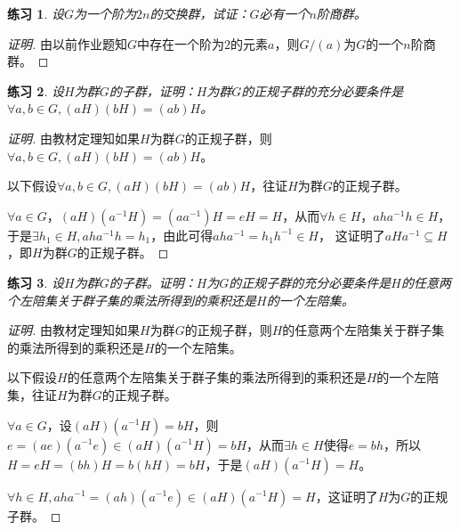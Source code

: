 \documentclass{article}
\newtheorem{Exercise}{练习}
\begin{document}
\begin{CJK*}{UTF8}{gbsn}

\begin{Exercise}
设$G$为一个阶为$2n$的交换群，试证：$G$必有一个$n$阶商群。
\end{Exercise}
\begin{proof}[证明]
  由以前作业题知$G$中存在一个阶为$2$的元素$a$，则$G/(a)$为$G$的一个$n$阶商群。
\end{proof}
\begin{Exercise}
设$H$为群$G$的子群，证明：$H$为群$G$的正规子群的充分必要条件是$\forall a,b\in G,(aH)(bH)=(ab)H$。
\end{Exercise}

\begin{proof}[证明]
  由教材定理知如果$H$为群$G$的正规子群，则$\forall a,b\in G,(aH)(bH)=(ab)H$。

  以下假设$\forall a,b\in G,(aH)(bH)=(ab)H$，往证$H$为群$G$的正规子群。

  $\forall a\in G$，$(aH)(a^{-1}H)=(aa^{-1})H=eH=H$，从而$\forall h\in H$，$aha^{-1}h\in H$，于是$\exists h_1\in H, aha^{-1}h=h_1$，由此可得$aha^{-1}=h_1h^{-1}\in H$，
  这证明了$aHa^{-1}\subseteq H$，即$H$为群$G$的正规子群。
\end{proof}

\begin{Exercise}
  设$H$为群$G$的子群。证明：$H$为$G$的正规子群的充分必要条件是$H$的任意两个左陪集关于群子集的乘法所得到的乘积还是$H$的一个左陪集。
\end{Exercise}
\begin{proof}[证明]
  由教材定理知如果$H$为群$G$的正规子群，则$H$的任意两个左陪集关于群子集的乘法所得到的乘积还是$H$的一个左陪集。

  以下假设$H$的任意两个左陪集关于群子集的乘法所得到的乘积还是$H$的一个左陪集，往证$H$为群$G$的正规子群。

  $\forall a\in G$，设$(aH)(a^{-1}H)=bH$，则$e=(ae)(a^{-1}e)\in (aH)(a^{-1}H)=bH$，从而$\exists h\in H$使得$e=bh$，所以$H=eH=(bh)H=b(hH)=bH$，于是$(aH)(a^{-1}H)=H$。

$\forall h\in H, aha^{-1}=(ah)(a^{-1}e)\in (aH)(a^{-1}H)=H$，这证明了$H$为$G$的正规子群。
\end{proof}
\end{CJK*}
\end{document}

